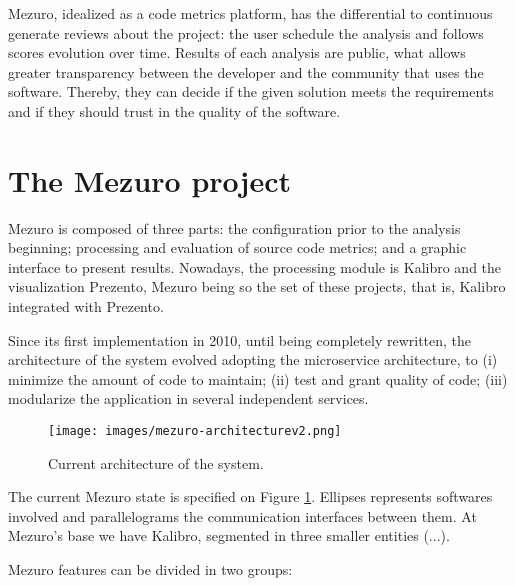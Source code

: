 \documentclass{llncs}
\begin{document}
Mezuro, idealized as a code metrics platform, has the differential to
continuous generate reviews about the project: the user schedule the
analysis and follows scores evolution over time. Results of each analysis
are public, what allows greater transparency between the developer and the
community that uses the software. Thereby, they can decide if the given solution
meets the requirements and if they should trust in the quality of the software.

\section{The Mezuro project}
\label{sec:mezuro}

Mezuro is composed of three parts: the configuration prior to the analysis beginning;
processing and evaluation of source code metrics; and a graphic interface to
present results. Nowadays, the processing module is Kalibro and the visualization
Prezento, Mezuro being so the set of these projects, that is, Kalibro integrated
with Prezento.

Since its first implementation in 2010\cite{mezuro2012}, until being completely
rewritten, the architecture of the system evolved adopting the microservice architecture\cite{namiot2014micro},
to (i) minimize the amount of code to maintain;
(ii) test and grant quality of code;
(iii) modularize the application in several independent services.

\begin{figure}[hbt]
  \centering
    \texttt{[image: images/mezuro-architecturev2.png]}
  \caption{Current architecture of the system.}
  \label{fig:architecture-2}
\end{figure}


The current Mezuro state is specified on Figure \ref{fig:architecture-2}. Ellipses represents
softwares involved and parallelograms the communication interfaces between them. At Mezuro's
base we have Kalibro, segmented in three smaller entities (...).

Mezuro features can be divided in two groups:
\end{document}
